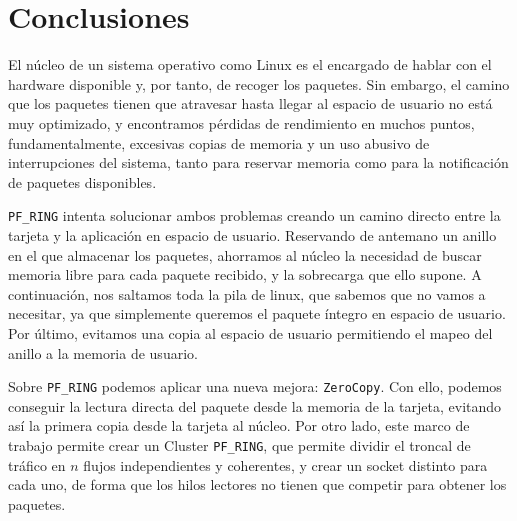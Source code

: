 \section{Conclusiones}
El núcleo de un sistema operativo como Linux es el encargado de hablar con el hardware disponible y, por tanto, de 
recoger los paquetes. Sin embargo, el camino que los paquetes tienen que atravesar hasta llegar al espacio de usuario 
no está muy optimizado, y encontramos pérdidas de rendimiento en muchos puntos, fundamentalmente, excesivas copias de 
memoria y un uso abusivo de interrupciones del sistema, tanto para reservar memoria como para la notificación de 
paquetes disponibles.

\texttt{PF\_RING} intenta solucionar ambos problemas creando un camino directo entre la tarjeta y la aplicación en 
espacio de usuario. Reservando de antemano un anillo en el que almacenar los paquetes, ahorramos al núcleo la necesidad 
de buscar memoria libre para cada paquete recibido, y la sobrecarga que ello supone. A continuación, nos saltamos toda 
la pila de linux, que sabemos que no vamos a necesitar, ya que simplemente queremos el paquete íntegro en espacio de 
usuario. Por último, evitamos una copia al espacio de usuario permitiendo el mapeo del anillo a la memoria de usuario.

Sobre \texttt{PF\_RING} podemos aplicar una nueva mejora: \texttt{ZeroCopy}. Con ello, podemos conseguir la lectura 
directa del paquete desde la memoria de la tarjeta, evitando así la primera copia desde la tarjeta al núcleo. Por otro 
lado, este marco de trabajo permite crear un Cluster \texttt{PF\_RING}, que permite dividir el troncal de tráfico en 
$n$ flujos independientes y coherentes, y crear un socket distinto para cada uno, de forma que los hilos lectores no 
tienen que competir para obtener los paquetes.

